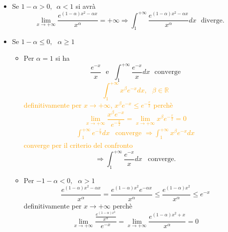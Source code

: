 \documentclass{article}
\newcommand{\R}{\mathbb{R}}
\begin{document}
\begin{itemize}
    \item Se $1-\alpha > 0, \,\,\, \alpha < 1$ si avrà
\begin{equation*}
\lim_{x\rightarrow +\infty}   \frac{e^{(1-\alpha)x^2-\alpha x}}{x^\alpha} =+\infty \Rightarrow \int_{1}^{+\infty}  \frac{e^{(1-\alpha)x^2-\alpha x}}{x^\alpha}dx \,\,\,\, \text{diverge.}
\end{equation*}
    \item Se $ 1-\alpha \leq 0 , \,\,\,\, \alpha \geq 1$
    \begin{itemize}
        \item Per $\alpha =1$ si ha
        \begin{equation*}
            \frac{e^{-x}}{x} \,\,\,\, \text{e}\,\,\,\, \int_{1}^{+\infty} \frac{e^{-x}}{x}dx \,\,\,\, \text{converge}
        \end{equation*}
    \textcolor{orange}{
    \begin{equation*}
        \int_{1}^{+\infty} x^\beta e^{-x}dx, \,\,\,\, \beta \in \R
    \end{equation*}
    definitivamente per $x\rightarrow +\infty$, $x^{\beta}e^{-x}\leq e^{-\frac{x}{2}}$ perchè 
    \begin{equation*}
        \lim_{x \rightarrow +\infty} \frac{x^\beta e^{-x}}{e^{-\frac{x}{2}}} = \lim_{x\rightarrow +\infty} x^{\beta}e^{-\frac{x}{2}}=0
    \end{equation*}
    \begin{align*}
        \int_{1}^{+\infty} e^{-\frac{x}{2}}dx \,\,\,\,\, \text{converge} \,\, \Rightarrow \int_{1}^{+\infty} x^\beta e^{-x}dx
    \end{align*}
    converge per il criterio del confronto
    }
    \begin{equation*}
        \Rightarrow \int_{1}^{+\infty}  \frac{e^{-x}}{x}dx \,\,\,\,\, \text{converge.}    
    \end{equation*}
    \item Per $-1-\alpha <0, \,\,\,\, \alpha >1$
    \begin{equation*}
        \frac{e^{(1-\alpha)x^2-\alpha x}}{x^\alpha}=\frac{e^{(1-\alpha)x^2}e^{-\alpha x}}{x^\alpha}\leq \frac{e^{(1-\alpha)x^2}}{x^\alpha} \leq e^{-x}
    \end{equation*}
    definitivamente per $x \rightarrow +\infty$ perchè
    \begin{equation*}
        \lim_{x \rightarrow +\infty} \frac{\frac{e^{(1-\alpha)x^2}}{x^\alpha}}{e^{-x}}=\lim_{x \rightarrow +\infty}\frac{e^{(1-\alpha)x^2+x}}{x^\alpha}=0

\end{equation*}
\end{itemize}
\end{itemize}
\end{document}
